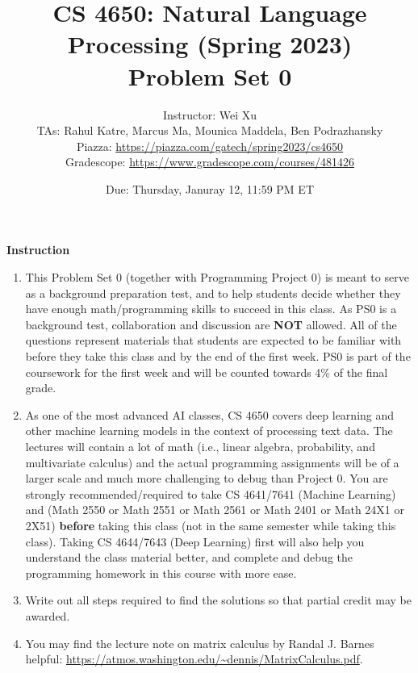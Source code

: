 \documentclass[11pt, letterpaper]{article}
\begin{document}
\title{CS 4650: Natural Language Processing (Spring 2023) \\ Problem Set 0}
\author{Instructor: Wei Xu \\ TAs: Rahul Katre, Marcus Ma, Mounica Maddela, Ben Podrazhansky
\\Piazza: \url{https://piazza.com/gatech/spring2023/cs4650}
\\Gradescope: \url{https://www.gradescope.com/courses/481426}}
\date{Due: Thursday, Januray 12, 11:59 PM ET}
\maketitle

{\Large \textbf{Instruction}}
\begin{enumerate}
    \item This Problem Set 0 (together with Programming Project 0) is meant to serve as a background preparation test, and to help students decide whether they have enough math/programming skills to succeed in this class. As PS0 is a background test, collaboration and discussion are \textbf{NOT} allowed. All of the questions represent materials that students are expected to be familiar with before they take this class and by the end of the first week. PS0 is part of the coursework for the first week and will be counted towards 4\%  of the final grade. 
    
    \item As one of the most advanced AI classes, CS 4650 covers deep learning and other machine learning models in the context of processing text data. The lectures will contain a lot of math (i.e., linear algebra, probability, and multivariate calculus) and the actual programming assignments will be of a larger scale and much more challenging to debug than Project 0. You are strongly recommended/required to take CS 4641/7641 (Machine Learning) and (Math 2550 or Math 2551 or Math 2561 or Math 2401 or Math 24X1 or 2X51) \textbf{before} taking this class (not in the same semester while taking this class). Taking CS 4644/7643 (Deep Learning) first will also help you understand the class material better, and complete and debug the programming homework in this course with more ease.

    
    \item Write out all steps required to find the solutions so that partial credit may be awarded.
    
    \item You may find the lecture note on matrix calculus by Randal J. Barnes helpful: \url{https://atmos.washington.edu/~dennis/MatrixCalculus.pdf}. 
    

\end{enumerate}
\end{document}
